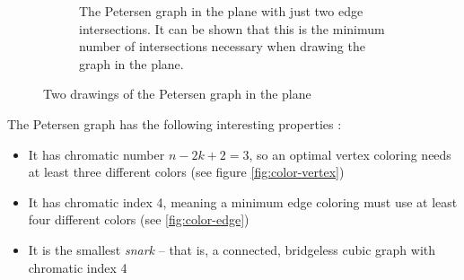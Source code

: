 \documentclass[11pt,            %
               a4paper,         %
               oneside,         %
               DIV12,           %
               fleqn,           %
               halfparskip,     %
               nochapterprefix, %
              ]{scrartcl} %
\theoremstyle{definition}
\begin{document}
\begin{figure}[p]
\begin{subfigure}[t]{.45\textwidth}
    \caption{The Petersen graph in the plane with just two edge
      intersections. It can be shown that this is the minimum number of
      intersections necessary when drawing the graph in the plane.}
    \label{fig:petersen-twointersect}
  \end{subfigure}
  \caption{Two drawings of the Petersen graph in the plane}
\end{figure}

The Petersen graph has the following interesting properties \cite{petersen}:

\begin{itemize}
  \item It has chromatic number $n - 2k + 2 = 3$, so an optimal vertex
    coloring needs at least three different colors (see figure
    \ref{fig:color-vertex})
  \item It has chromatic index 4, meaning a minimum edge coloring must
    use at least four different colors (see \ref{fig:color-edge})
  \item It is the smallest
    \emph{snark}\footnotemark{} -- that is, a connected, bridgeless cubic graph with
    chromatic index 4
\end{itemize}
\end{document}
